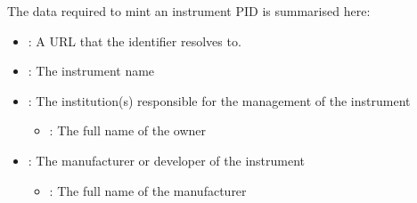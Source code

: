\documentclass[letterpaper,10pt,english]{sphinxmanual}
\begin{document}
\sphinxAtStartPar
The data required to mint an instrument PID is summarised here:
\begin{itemize}
\item {}
\sphinxAtStartPar
{}: A URL that the identifier resolves to.

\item {}
\sphinxAtStartPar
{}: The instrument name

\item {}
\sphinxAtStartPar
{}: The institution(s) responsible for the management of the instrument
\begin{itemize}
\item {}
\sphinxAtStartPar
{}: The full name of the owner

\end{itemize}

\item {}
\sphinxAtStartPar
{}: The manufacturer or developer of the instrument
\begin{itemize}
\item {}
\sphinxAtStartPar
{}: The full name of the manufacturer

\end{itemize}

\end{itemize}
\end{document}

